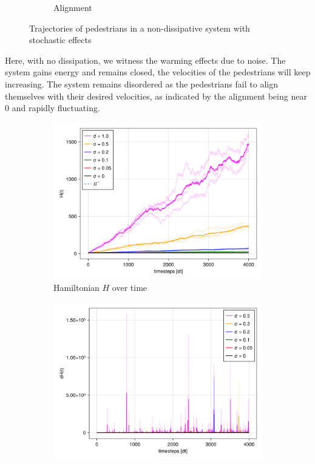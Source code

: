 \begin{itemize}
\begin{figure}[H]
\begin{subfigure}{.49\textwidth}
            \caption{Alignment}
            \label{plot:stoc_nodisp_alignment}
        \end{subfigure}
        \caption{Trajectories of pedestrians in a non-dissipative system with stochastic effects}
        \label{plot:stoc_nodisp}
    \end{figure}
Here, with no dissipation, we witness the warming effects due to noise. The system gains energy and remains closed, the velocities of the pedestrians will keep increasing. The system remains disordered as the pedestrians fail to align themselves with their desired velocities, as indicated by the alignment being near 0 and rapidly fluctuating.
    \begin{figure}[H]
        \centering
        \begin{subfigure}{.49\textwidth}
            \centering
            \includegraphics[width=\linewidth]{figures/ch5_basic_stoch/H_stochasic_nodisp.png}
            \caption{Hamiltonian $H$ over time}
            \label{plot:stoc_nodisp_h}
        \end{subfigure}
        \begin{subfigure}{.49\textwidth}
            \centering
            \includegraphics[width=\linewidth]{figures/ch5_basic_stoch/dH_stochasic_nodisp.png}

\end{subfigure}
\end{figure}
\end{itemize}
